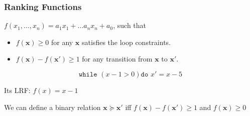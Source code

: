 \documentclass[11pt]{beamer}
\begin{document}
\begin{frame}\frametitle{Ranking Functions}

\begin{definition}

$f(x_1, \ldots, x_n) = a_1x_1 + \ldots a_nx_n + a_0$, such that

\begin{itemize}
\item $f(\textbf{x}) \ge 0$ for any $\textbf{x}$ satisfies the loop constraints.

\item $f(\textbf{x}) - f(\textbf{x}') \ge 1$ for any transition from $\textbf{x}$ to $\textbf{x}'$.



\end{itemize}
\end{definition}

\begin{example}
\[\texttt{while }( x - 1 > 0) \texttt{do } x' = x - 5\]

Its LRF: $f(x) = x - 1$
\end{example}

We can define a binary relation $\textbf{x} \succeq \textbf{x}'$ iff  $f(\textbf{x}) - f(\textbf{x}') \ge 1$ and $f(\textbf{x}) \ge 0$

\end{frame}
\end{document}
